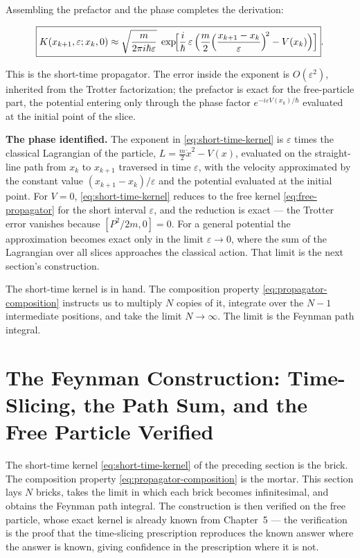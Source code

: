 Assembling the prefactor and the phase completes the derivation:
\begin{linenomath}
\begin{equation}
\boxed{K(x_{k+1},\varepsilon; x_k,0)
\approx \sqrt{\frac{m}{2\pi i\hbar\varepsilon}}\;
\exp\!\Bigl[\frac{i}{\hbar}\,\varepsilon\,
\Bigl(\frac{m}{2}\Bigl(\frac{x_{k+1}-x_k}{\varepsilon}\Bigr)^{\!2}
- V(x_k)\Bigr)\Bigr]} .
\label{eq:short-time-kernel}
\end{equation}
\end{linenomath}
This is the short-time propagator. The error inside the exponent is $O(\varepsilon^2)$, inherited from the Trotter factorization; the prefactor is exact for the free-particle part, the potential entering only through the phase factor $e^{-i\varepsilon V(x_k)/\hbar}$ evaluated at the initial point of the slice.

\medskip\noindent\textbf{The phase identified.} The exponent in \eqref{eq:short-time-kernel} is $\varepsilon$ times the classical Lagrangian of the particle, $L = \frac{m}{2}\dot{x}^2 - V(x)$, evaluated on the straight-line path from $x_k$ to $x_{k+1}$ traversed in time $\varepsilon$, with the velocity approximated by the constant value $(x_{k+1}-x_k)/\varepsilon$ and the potential evaluated at the initial point. For $V=0$, \eqref{eq:short-time-kernel} reduces to the free kernel \eqref{eq:free-propagator} for the short interval $\varepsilon$, and the reduction is exact --- the Trotter error vanishes because $[P^2/2m, 0] = 0$. For a general potential the approximation becomes exact only in the limit $\varepsilon \to 0$, where the sum of the Lagrangian over all slices approaches the classical action. That limit is the next section's construction.

\medskip\noindent The short-time kernel is in hand. The composition property \eqref{eq:propagator-composition} instructs us to multiply $N$ copies of it, integrate over the $N-1$ intermediate positions, and take the limit $N \to \infty$. The limit is the Feynman path integral.


\section{The Feynman Construction: Time-Slicing, the Path Sum, and the Free Particle Verified}
\label{sec:feynman-construction}

The short-time kernel \eqref{eq:short-time-kernel} of the preceding section is the brick. The composition property \eqref{eq:propagator-composition} is the mortar. This section lays $N$ bricks, takes the limit in which each brick becomes infinitesimal, and obtains the Feynman path integral. The construction is then verified on the free particle, whose exact kernel is already known from Chapter~5 --- the verification is the proof that the time-slicing prescription reproduces the known answer where the answer is known, giving confidence in the prescription where it is not.

